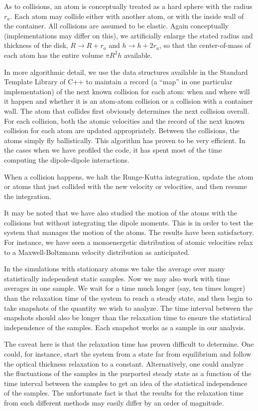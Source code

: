 As to collisions, an atom is conceptually treated as a hard sphere with the radius $r_a$. Each atom may collide either with another atom, or with the inside wall of the container. All collisions are assumed to be elastic. Again conceptually (implementations may differ on this), we artificially enlarge the stated radius and thickness of the disk, 
$R\rightarrow R+r_a$ and $h\rightarrow h+2r_a$, so that the center-of-mass of each atom has the entire volume $\pi R^2h$ available.

In more algorithmic detail, we use the data structures available in the Standard Template Library of C++ to maintain a record (a ``map'' in one particular implementation) of the next known collision for each atom: when and where will it happen and whether it is an atom-atom collision or a collision with a container wall. The atom that collides first obviously determines the next collision overall. For each collision, both the atomic velocities and the record of the next known collision for each atom are updated appropriately. Between the collisions, the atoms simply fly ballistically. This algorithm has proven to be very efficient. In the cases when we have profiled the code, it has spent most of the time computing the dipole-dipole interactions.

When a collision happens, we halt the Runge-Kutta integration, update the atom or atoms that just collided with the new velocity or velocities, and then resume the integration.

It may be noted that we have also studied the motion of the atoms with the collisions but without integrating the dipole moments. This is in order to test the system that manages the motion of the atoms. The results have been satisfactory. For instance, we have seen a monoenergetic distribution of atomic velocities relax to a Maxwell-Boltzmann velocity distribution as anticipated.

In the simulations with stationary atoms we take the average over many statistically independent static samples. Now we may also work with time averages in one sample.  We wait for a time much longer (say, ten times longer) than the relaxation time of the system to reach a steady state, and then begin to take snapshots of the quantity we wish to analyze. The time interval between the snapshots should also be longer than the relaxation time to ensure the statistical independence of the samples. Each snapshot works as a sample in our analysis. 

The caveat here is that the relaxation time has proven difficult to determine. One could, for instance, start the system from a state far from equilibrium and follow the optical thickness relaxation to a constant. Alternatively, one could analyze the fluctuations of the samples in the purported steady state as a function of the time interval between the samples to get an idea of the statistical independence of the samples. The unfortunate fact is that the results for the relaxation time from such different methods may easily differ by an order of magnitude.


